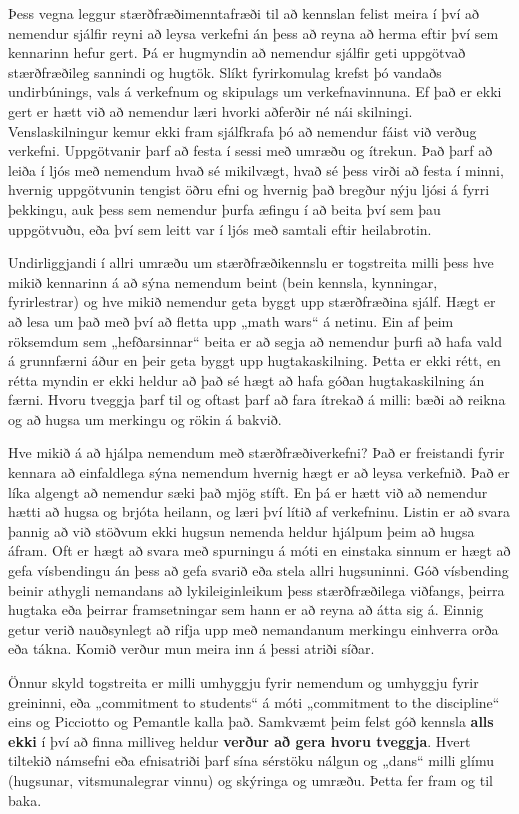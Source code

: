 \documentclass[
  icelandic,
]{book}
\begin{document}
Þess vegna leggur stærðfræðimenntafræði til að kennslan felist meira í því að nemendur sjálfir reyni að leysa verkefni án þess að reyna að herma eftir því sem kennarinn hefur gert. Þá er hugmyndin að nemendur sjálfir geti uppgötvað stærðfræðileg sannindi og hugtök. Slíkt fyrirkomulag krefst þó vandaðs undirbúnings, vals á verkefnum og skipulags um verkefnavinnuna. Ef það er ekki gert er hætt við að nemendur læri hvorki aðferðir né nái skilningi. Venslaskilningur kemur ekki fram sjálfkrafa þó að nemendur fáist við verðug verkefni. Uppgötvanir þarf að festa í sessi með umræðu og ítrekun. Það þarf að leiða í ljós með nemendum hvað sé mikilvægt, hvað sé þess virði að festa í minni, hvernig uppgötvunin tengist öðru efni og hvernig það bregður nýju ljósi á fyrri þekkingu, auk þess sem nemendur þurfa æfingu í að beita því sem þau uppgötvuðu, eða því sem leitt var í ljós með samtali eftir heilabrotin.

Undirliggjandi í allri umræðu um stærðfræðikennslu er togstreita milli þess hve mikið kennarinn á að sýna nemendum beint (bein kennsla, kynningar, fyrirlestrar) og hve mikið nemendur geta byggt upp stærðfræðina sjálf. Hægt er að lesa um það með því að fletta upp „math wars`` á netinu. Ein af þeim röksemdum sem „hefðarsinnar`` beita er að segja að nemendur þurfi að hafa vald á grunnfærni áður en þeir geta byggt upp hugtakaskilning. Þetta er ekki rétt, en rétta myndin er ekki heldur að það sé hægt að hafa góðan hugtakaskilning án færni. Hvoru tveggja þarf til og oftast þarf að fara ítrekað á milli: bæði að reikna og að hugsa um merkingu og rökin á bakvið.

Hve mikið á að hjálpa nemendum með stærðfræðiverkefni? Það er freistandi fyrir kennara að einfaldlega sýna nemendum hvernig hægt er að leysa verkefnið. Það er líka algengt að nemendur sæki það mjög stíft. En þá er hætt við að nemendur hætti að hugsa og brjóta heilann, og læri því lítið af verkefninu. Listin er að svara þannig að við stöðvum ekki hugsun nemenda heldur hjálpum þeim að hugsa áfram. Oft er hægt að svara með spurningu á móti en einstaka sinnum er hægt að gefa vísbendingu án þess að gefa svarið eða stela allri hugsuninni. Góð vísbending beinir athygli nemandans að lykileiginleikum þess stærðfræðilega viðfangs, þeirra hugtaka eða þeirrar framsetningar sem hann er að reyna að átta sig á. Einnig getur verið nauðsynlegt að rifja upp með nemandanum merkingu einhverra orða eða tákna. Komið verður mun meira inn á þessi atriði síðar.

Önnur skyld togstreita er milli umhyggju fyrir nemendum og umhyggju fyrir greininni, eða „commitment to students`` á móti „commitment to the discipline`` eins og Picciotto og Pemantle kalla það. Samkvæmt þeim felst góð kennsla \textbf{alls ekki} í því að finna milliveg heldur \textbf{verður að gera hvoru tveggja}. Hvert tiltekið námsefni eða efnisatriði þarf sína sérstöku nálgun og „dans`` milli glímu (hugsunar, vitsmunalegrar vinnu) og skýringa og umræðu. Þetta fer fram og til baka.
\end{document}
